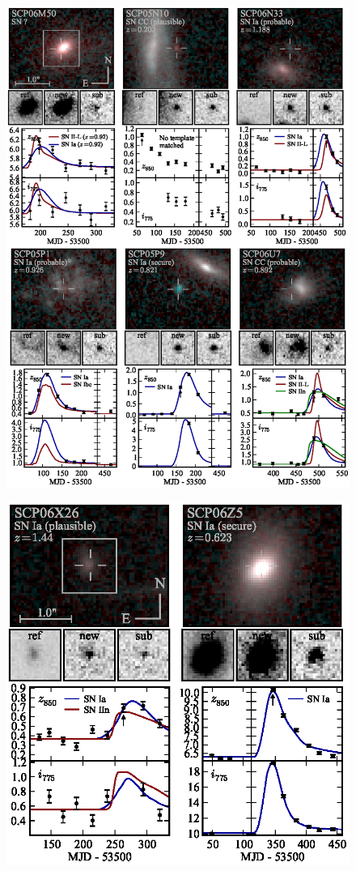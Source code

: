 \begin{figure}[p]
\includegraphics[width=\textwidth]{figures/cands/sn5.eps}
\end{figure}

\begin{figure}[t]
\includegraphics[width=\textwidth]{figures/cands/sn6.eps}
\end{figure}

